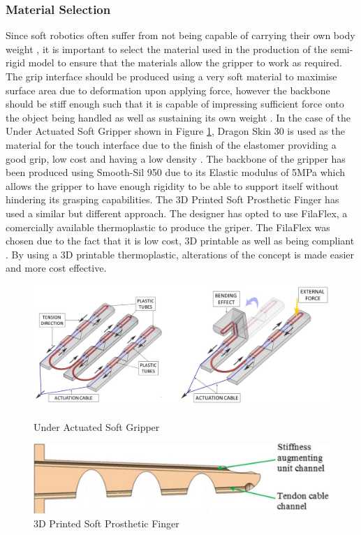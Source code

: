 \documentclass[11pt,twocolumn]{article}
\begin{document}
\subsubsection{Material Selection}
Since soft robotics often suffer from not being capable of carrying their own body weight \cite{mutlu2016mechanical}, it is important to select the material used in the production of the semi-rigid model to ensure that the materials allow the gripper to work as required. The grip interface should be produced using a very soft material to maximise surface area due to deformation upon applying force, however the backbone should be stiff enough such that it is capable of impressing sufficient force onto the object being handled as well as sustaining its own weight \cite{hassan2015design}. In the case of the Under Actuated Soft Gripper shown in Figure \ref{fig:Tendon2}, Dragon Skin 30 is used as the material for the touch interface due to the finish of the elastomer providing a good grip, low cost and having a low density \cite{hassan2015design}. The backbone of the gripper has been produced using Smooth-Sil 950 due to its Elastic modulus of 5MPa which allows the gripper to have enough rigidity to be able to support itself without hindering its grasping capabilities. The 3D Printed Soft Prosthetic Finger has used a similar but different approach. The designer has opted to use FilaFlex, a comercially available thermoplastic to produce the griper. The FilaFlex was chosen due to the fact that it is low cost, 3D printable as well as being compliant \cite{mutlu2016mechanical}. By using a 3D printable thermoplastic, alterations of the  concept is made easier and more cost effective.
\begin{figure}[!h]
\centering
\begin{minipage}[b]{.55\textwidth}
\includegraphics[width=\linewidth]{Tendon}
\caption{Under Actuated Soft Gripper}
\label{fig:Tendon}
\end{minipage}
\hfill
\begin{minipage}[b]{0.35\textwidth}
\includegraphics[width=1.15\linewidth]{Tendon2}
\caption{3D Printed Soft Prosthetic Finger}
\label{fig:Tendon2}
\end{minipage}
\end{figure}
\end{document}

